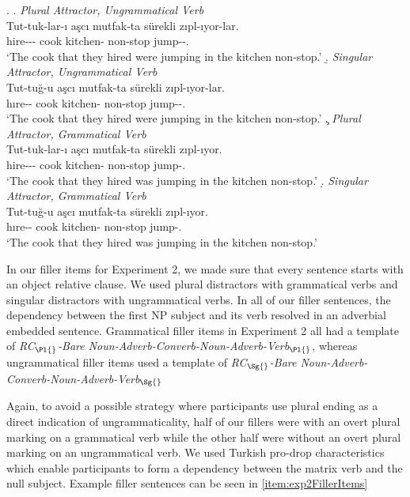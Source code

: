 \documentclass[a4paper,man,natbib]{apa6}\usepackage[]{graphicx}\usepackage[]{color}
\begin{document}
\ex. \label{item:exp2ExperimentalItems}
\a. \textit{Plural Attractor, Ungrammatical Verb}\\ 
\gll *Tut-tuk-lar-ı aşcı mutfak-ta sürekli zıpl-ıyor-lar.\\ 
hire-\Nmlz{}-\Pl{}-\Poss{}  cook kitchen-\Loc{} non-stop  jump-\Prog{}-\Pl{}.\\
\glt `The cook that they hired were jumping in the kitchen non-stop.' 
\b. \textit{Singular Attractor, Ungrammatical Verb}\\ 
\gll *Tut-tuğ-u aşcı mutfak-ta sürekli zıpl-ıyor-lar.\\ 
hıre-\Nmlz{}-\Poss{}  cook kitchen-\Loc{} non-stop  jump-\Prog{}-\Pl{}.\\
\glt `The cook that they hired were jumping in the kitchen non-stop.'
\c. \textit{Plural Attractor, Grammatical Verb}\\ 
\gll Tut-tuk-lar-ı aşcı mutfak-ta sürekli zıpl-ıyor.\\ 
hire-\Nmlz{}-\Pl{}-\Poss{}  cook kitchen-\Loc{} non-stop  jump-\Prog{}.\\
\glt `The cook that they hired was jumping in the kitchen non-stop.'
\d. \textit{Singular Attractor, Grammatical Verb}\\ 
\gll Tut-tuğ-u aşcı mutfak-ta sürekli zıpl-ıyor.\\ 
hıre-\Nmlz{}-\Poss{}  cook kitchen-\Loc{} non-stop  jump-\Prog{}.\\
\glt `The cook that they hired was jumping in the kitchen non-stop.'

In our filler items for Experiment 2, we made sure that every sentence starts with an object relative clause. We used plural distractors with grammatical verbs and singular distractors with ungrammatical verbs. In all of our filler sentences, the dependency between the first NP subject and its verb resolved in an adverbial embedded sentence. Grammatical filler items in Experiment 2 all had a template of \textit{RC$_{\Pl{}}$-Bare Noun-Adverb-Converb-Noun-Adverb-Verb$_{\Pl{}}$}, whereas ungrammatical filler items used a template of \textit{RC$_{\Sg{}}$-Bare Noun-Adverb-Converb-Noun-Adverb-Verb$_{\Sg{}}$}

Again, to avoid a possible strategy where participants use plural ending as a direct indication of ungrammaticality, half of our fillers were with an overt plural marking on a grammatical verb while the other half were without an overt plural marking on an ungrammatical verb. We used Turkish pro-drop characteristics which enable participants to form a dependency between the matrix verb and the null subject. Example filler sentences can be seen in \ref{item:exp2FillerItems} 
\end{document}
